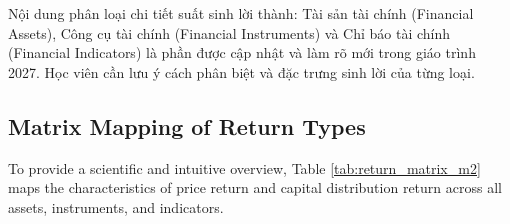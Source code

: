 
\begin{examtip}[title={Cập nhật chương trình 2027}, colframe=red!75!black, colback=red!5!white]
Nội dung phân loại chi tiết suất sinh lời thành: Tài sản tài chính (Financial Assets), Công cụ tài chính (Financial Instruments) và Chỉ báo tài chính (Financial Indicators) là phần được cập nhật và làm rõ mới trong giáo trình 2027. Học viên cần lưu ý cách phân biệt và đặc trưng sinh lời của từng loại.
\end{examtip}

\subsection{Matrix Mapping of Return Types}
	\label{subsec:Matrix Mapping of Return Types}
To provide a scientific and intuitive overview, Table \ref{tab:return_matrix_m2} maps the characteristics of price return and capital distribution return across all assets, instruments, and indicators.

